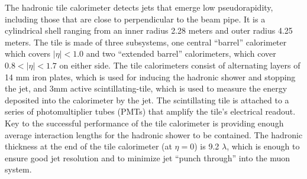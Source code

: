 
The hadronic tile calorimeter detects jets that emerge low pseudorapidity, including those that are close to perpendicular to the beam pipe.
It is a cylindrical shell ranging from an inner radius 2.28 meters and outer radius 4.25 meters.
The tile is made of three subsystems, one central ``barrel'' calorimeter which covers $|\eta| < 1.0$ and two ``extended barrel'' calorimeters, which cover $0.8 < |\eta| < 1.7$ on either side.
The tile calorimeters consist of alternating layers of 14 mm iron plates, which is used for inducing the hadronic shower and stopping the jet, and 3mm active scintillating-tile, which is used to measure the energy deposited into the calorimeter by the jet.
The scintillating tile is attached to a series of photomultiplier tubes (PMTs) that amplify the tile's electrical readout.
Key to the successful performance of the tile calorimeter is providing enough average interaction lengths for the hadronic shower to be contained.
The hadronic thickness at the end of the tile calorimeter (at $\eta=0$) is 9.2 $\lambda$, which is enough to ensure good jet resolution and to minimize jet ``punch through'' into the muon system.



